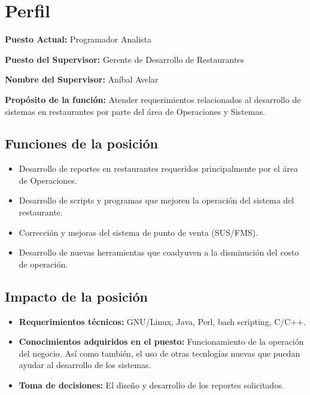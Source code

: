 
\chapter{Perfil}
\label{chap:perfil}

\textbf{Puesto Actual:} Programador Analista

\textbf{Puesto del Supervisor:} Gerente de Desarrollo de Restaurantes 

\textbf{Nombre del Supervisor:} Aníbal Avelar

\textbf{Propósito de la función:} Atender requerimientos relacionados al desarrollo de sistemas en restaurantes por parte del área de Operaciones y Sistemas.


\section{Funciones de la posición}
\label{sec:func_posicion}


\begin{itemize}
 \item Desarrollo de reportes en restaurantes requeridos principalmente por el área de Operaciones.
 \item Desarrollo de scripts y programas que mejoren la operación del sistema del restaurante.
 \item Corrección y mejoras del sistema de punto de venta (SUS/FMS).
 \item Desarrollo de nuevas herramientas que coadyuven a la disminución del costo de operación.
\end{itemize}

\section{Impacto de la posición}
\label{sec:empacto_posicion}


\begin{itemize}
 \item \textbf{Requerimientos técnicos:} GNU/Linux, Java, Perl, bash scripting, C/C++.
 \item \textbf{Conocimientos adquiridos en el puesto:} Funcionamiento de la operación del negocio. Así como también, el uso de otras tecnlogías nuevas que puedan ayudar al desarrollo de los sistemas.
 \item \textbf{Toma de decisiones:} El diseño y desarrollo de los reportes solicitados.
\end{itemize}

